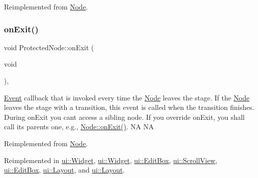 Reimplemented from \hyperlink{classNode_afef4b2a863042a9ea456e952cf26991d}{Node}.

\mbox{\label{classProtectedNode_ad3eed150eb7243f2de8b2e527752a3a6}} 
\subsubsection{\texorpdfstring{on\+Exit()}{onExit()}\hspace{0.1cm}{\footnotesize\ttfamily [1/2]}}
{\footnotesize\ttfamily void Protected\+Node\+::on\+Exit (\begin{DoxyParamCaption}\item[{void}]{ }\end{DoxyParamCaption})\hspace{0.3cm}{\ttfamily [override]}, {\ttfamily [virtual]}}

\hyperlink{classEvent}{Event} callback that is invoked every time the \hyperlink{classNode}{Node} leaves the \textquotesingle{}stage\textquotesingle{}. If the \hyperlink{classNode}{Node} leaves the \textquotesingle{}stage\textquotesingle{} with a transition, this event is called when the transition finishes. During on\+Exit you can\textquotesingle{}t access a sibling node. If you override on\+Exit, you shall call its parent\textquotesingle{}s one, e.\+g., \hyperlink{classNode_ac83de835ea315e3179d4293acd8903ac}{Node\+::on\+Exit()}.  NA  NA 

Reimplemented from \hyperlink{classNode_ac83de835ea315e3179d4293acd8903ac}{Node}.



Reimplemented in \hyperlink{classui_1_1Widget_a541dd9c8492eeb30a2e50b97cc94bd6e}{ui\+::\+Widget}, \hyperlink{classui_1_1Widget_a91cbac90873d76b6edb0e41eed5477eb}{ui\+::\+Widget}, \hyperlink{classui_1_1EditBox_a4c5c9db7c8b7711a719aec6a0842696b}{ui\+::\+Edit\+Box}, \hyperlink{classui_1_1ScrollView_a9c9bf9f6d171a618d57c369e53d91a25}{ui\+::\+Scroll\+View}, \hyperlink{classui_1_1EditBox_a4151e7abfe84c879cc89f683c4975285}{ui\+::\+Edit\+Box}, \hyperlink{classui_1_1Layout_ad6be3b3eb4ca53dcbd3eb1ca966299ff}{ui\+::\+Layout}, and \hyperlink{classui_1_1Layout_a6444f3e3f124723e75f80b3d36408e34}{ui\+::\+Layout}.

\mbox{\label{classProtectedNode_a9f3d5d68659c662187089b18cc2dbda3}} 
